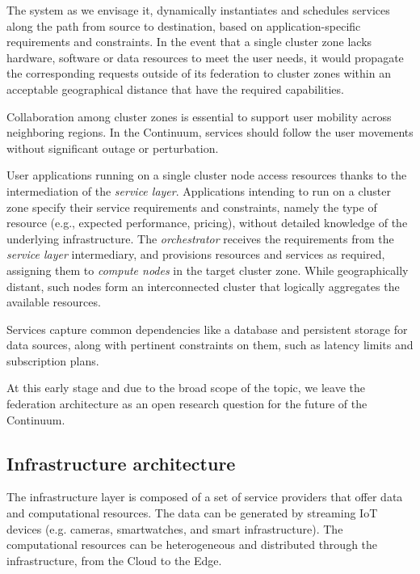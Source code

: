 The system as we envisage it, dynamically instantiates and schedules services along the path from source to destination, based on application-specific requirements and constraints. 
In the event that a single cluster zone lacks hardware, software or data resources to meet the user needs, it would propagate the corresponding requests outside of its federation to cluster zones within an acceptable geographical distance that have the required capabilities.

Collaboration among cluster zones is essential to support user mobility across neighboring regions. 
In the Continuum, services should follow the user movements without significant outage or perturbation.

User applications running on a single cluster node access resources thanks to the intermediation of the \textit{service layer}. Applications intending to run on a cluster zone specify their service requirements and constraints, namely the type of resource (e.g., expected performance, pricing), without detailed knowledge of the underlying infrastructure. 
The \textit{orchestrator} receives the requirements from the \textit{service layer} intermediary, and provisions resources and services as required, assigning them to \textit{compute nodes} in the target cluster zone.
While geographically distant, such nodes form an interconnected cluster that logically aggregates the available resources.

Services capture common dependencies like a database and persistent storage for data sources, along with pertinent constraints on them, such as latency limits and subscription plans.

At this early stage and due to the broad scope of the topic, we leave the federation architecture as an open research question for the future of the Continuum. 

\subsection{Infrastructure architecture}

The infrastructure layer is composed of a set of service providers that offer data and computational resources. The data can be generated by streaming IoT devices (e.g. cameras, smartwatches, and smart infrastructure). 
The computational resources can be heterogeneous and distributed through the infrastructure, from the Cloud to the Edge.

